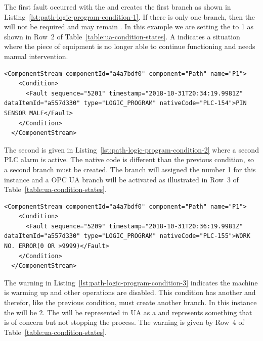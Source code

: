 The first fault occurred with the   and creates the first branch as shown in Listing~\ref{lst:path-logic-program-condition-1}. If there is only one branch, then the  will not be required and may remain . In this example we are setting the  to 1 as shown in Row~2 of Table~\ref{table:ua-condition-states}. A  indicates a situation where the piece of equipment is no longer able to continue functioning and needs manual intervention.

\begin{lstlisting}[firstnumber=last,escapechar=|,%
    caption={Path Logic Program First Fault PLC-154},label={lst:path-logic-program-condition-1}]
  <ComponentStream componentId="a4a7bdf0" component="Path" name="P1">
    <Condition>
      <Fault sequence="5201" timestamp="2018-10-31T20:34:19.9981Z" dataItemId="a557d330" type="LOGIC_PROGRAM" nativeCode="PLC-154">PIN SENSOR MALF</Fault>
    </Condition>
  </ComponentStream>
\end{lstlisting}

The second  is given in Listing~\ref{lst:path-logic-program-condition-2} where a second PLC alarm is active. The native code is different than the previous condition, so a second branch must be created. The branch will assigned the number 1 for this instance and a OPC UA branch will be activated as illustrated in Row~3 of Table~\ref{table:ua-condition-states}. 

\begin{lstlisting}[firstnumber=last,escapechar=|,%
    caption={Path Logic Program Second Fault PLC-155},label={lst:path-logic-program-condition-2}]
  <ComponentStream componentId="a4a7bdf0" component="Path" name="P1">
    <Condition>
      <Fault sequence="5209" timestamp="2018-10-31T20:36:19.9981Z" dataItemId="a557d330" type="LOGIC_PROGRAM" nativeCode="PLC-155">WORK NO. ERROR(0 OR >9999)</Fault>
    </Condition>
  </ComponentStream>
\end{lstlisting}

The warning in Listing~\ref{lst:path-logic-program-condition-3} indicates the machine is warming up and other operations are disabled. This condition has another  and therefor, like the previous condition, must create another branch. In this instance the  will be 2. The  will be represented in UA as a  and represents something that is of concern but not stopping the process. The warning is given by Row~4 of Table~\ref{table:ua-condition-states}.


